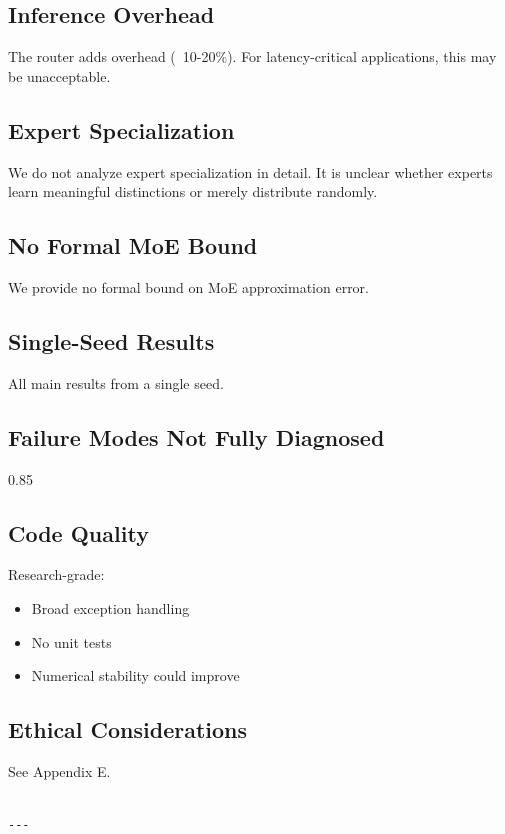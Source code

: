 \subsection{Inference Overhead}

The router adds overhead (~10-20\%). For latency-critical applications, this 
may be unacceptable.

\subsection{Expert Specialization}

We do not analyze expert specialization in detail. It is unclear whether 
experts learn meaningful distinctions or merely distribute randomly.

\subsection{No Formal MoE Bound}

We provide no formal bound on MoE approximation error.

\subsection{Single-Seed Results}

All main results from a single seed.

\subsection{Failure Modes Not Fully Diagnosed}

0.85

\subsection{Code Quality}

Research-grade:
\begin{itemize}
\item Broad exception handling
\item No unit tests
\item Numerical stability could improve

\end{itemize}
\subsection{Ethical Considerations}

See Appendix E.
\begin{lstlisting}

---
\end{lstlisting}